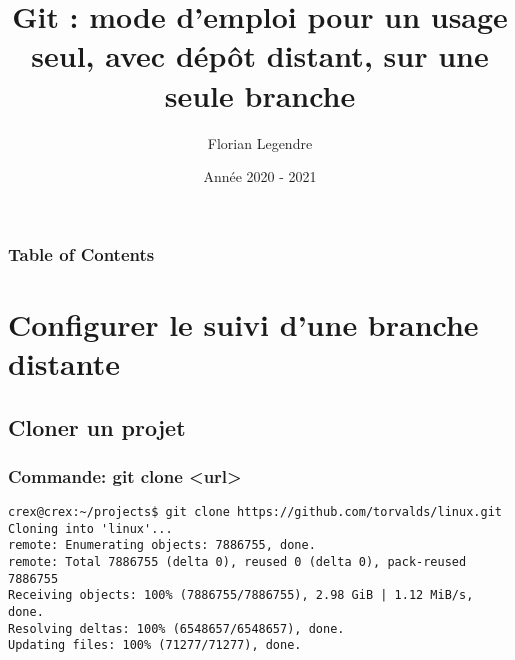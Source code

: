 \documentclass{beamer}
\title[Git seul connecté mono-branche]{Git : mode d'emploi pour un usage seul, avec dépôt distant, sur une seule branche}
\author{Florian Legendre}
\institute{Université de Poitiers}
\date{Année 2020 - 2021}
\begin{document}
\frame{\titlepage}

\begin{frame}
\frametitle{Table of Contents}
\tableofcontents[hideallsubsections]
\end{frame}


\section{Configurer le suivi d'une branche distante}

\subsection{Cloner un projet}

\begin{frame}[fragile]
\frametitle{Commande: git clone <url>}
\begin{mdframed}[style=Bash]
    \begin{lstlisting}[style=Bash, caption={Exemple de git clone}]
crex@crex:~/projects$ git clone https://github.com/torvalds/linux.git
Cloning into 'linux'...
remote: Enumerating objects: 7886755, done.
remote: Total 7886755 (delta 0), reused 0 (delta 0), pack-reused 7886755
Receiving objects: 100% (7886755/7886755), 2.98 GiB | 1.12 MiB/s, done.
Resolving deltas: 100% (6548657/6548657), done.
Updating files: 100% (71277/71277), done.
    \end{lstlisting}
    \end{mdframed}
\end{frame}
\end{document}

